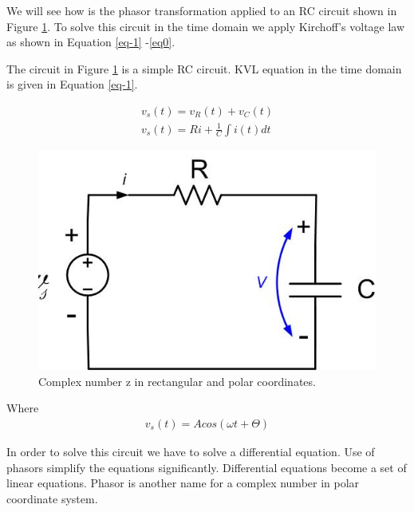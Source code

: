 \documentclass{ximera}
\begin{document}
\begin{example}

We will see how is the phasor transformation applied to an RC circuit shown in Figure \ref{RCcirc}.  To solve this circuit in the time domain we apply Kirchoff's voltage law as shown in Equation \ref{eq-1} -\ref{eq0}.


The circuit in Figure \ref{RCcirc} is a simple RC circuit. KVL equation in the time domain is given in Equation \ref{eq-1}.

\begin{eqnarray}
        v_s(t)=v_R(t)+v_C(t)                \label{eq-1}  \\
v_s(t) = R i + \frac{1}{C} \int i(t) dt \label{eq0}
\end{eqnarray} 


\begin{figure}[htbp]
\begin{center}
\includegraphics[scale=0.3]{../jpg/RCnew.jpg}
\end{center}
\caption{Complex number z in rectangular and polar coordinates.}
\label{RCcirc}
\end{figure}




Where
\begin{eqnarray}
v_s(t)= A cos (\omega t + \Theta ) \label{eq1}
\end{eqnarray}

In order to solve this circuit we have to  solve a differential equation.
Use of phasors simplify the equations
significantly. Differential equations become a set of
linear equations.  Phasor is another name for a complex number  in polar coordinate system. 


\end{example}
\end{document}
